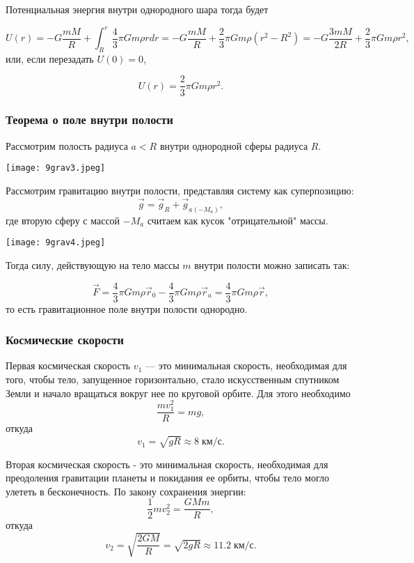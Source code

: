 \documentclass[12pt, a4paper]{article}%
\begin{document}
Потенциальная энергия внутри однородного шара тогда будет 

\[
U(r) = -G\frac{mM}{R} + \int_R^r \frac43\pi Gm\rho r dr = -G\frac{mM}{R} + \frac23\pi Gm\rho (r^2-R^2) =  -G\frac{3mM}{2R}+\frac23\pi Gm\rho r^2, 
\]
или, если перезадать $U(0) = 0$, 

\[
U(r) = \frac23\pi Gm\rho r^2.
\]
\subsubsection*{Теорема о поле внутри полости}
Рассмотрим полость радиуса $a < R$ внутри однородной сферы радиуса $R$.


\begin{center}
\texttt{[image: 9grav3.jpeg]}
\label{fig:mpr}
\end{center}


Рассмотрим гравитацию внутри полости, представляя систему как суперпозицию:
\[
\vec g = \vec g_{R} + \vec g_{a (-M_a)},
\]
где вторую сферу с массой $-M_a$ считаем как кусок "отрицательной" массы.

\begin{center}
\texttt{[image: 9grav4.jpeg]}
\label{fig:mpr}
\end{center}

Тогда силу, действующую на тело массы $m$ внутри полости можно записать так:

\[
\vec F = \frac43\pi Gm\rho \vec r_0 - \frac43\pi Gm\rho \vec r_a = \frac43\pi Gm\rho \vec r,
\]
то есть гравитационное поле внутри полости однородно.

\subsubsection*{Космические скорости}
Первая космическая скорость $v_1$ --- это минимальная скорость, необходимая для того, чтобы тело, запущенное горизонтально, стало искусственным спутником Земли и начало вращаться вокруг нее по круговой орбите.
Для этого необходимо
\[
\frac{mv_1^2}{R} = mg,
\]
откуда
\[
v_1 = \sqrt{gR} \approx 8\;\text{км/с}.
\]

Вторая космическая скорость - это минимальная скорость, необходимая для преодоления гравитации планеты и покидания ее орбиты, чтобы тело могло улететь в бесконечность. По закону сохранения энергии:
\[
\frac12mv_2^2 = \frac{GMm}{R},
\]
откуда
\[
v_2 = \sqrt{\frac{2GM}{R}} = \sqrt{2gR}\approx 11.2\;\text{км/с}.
\]
\end{document}
